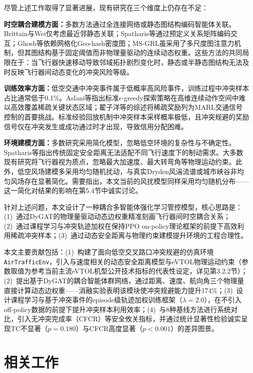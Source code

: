 \documentclass[12pt,a4paper,UTF8]{ctexart}
\begin{document}
尽管上述工作取得了显著进展，现有研究在三个维度上仍存在不足：

\textbf{时空耦合建模方面：}多数方法通过全连接网络或静态图结构编码智能体关联。Brittain与Wei仅考虑最近邻静态关联\cite{ref3}；Spatharis等通过预定义关系矩阵编码交互\cite{ref7}；Ghosh等依赖网格化Geo-hash密度图\cite{ref9}；MS-GRL虽采用了多尺度图注意力机制，但其图结构基于固定阈值而非物理量驱动的连续动态权重\cite{ref24}。这些方法的共同局限在于：当飞行器快速移动导致邻域拓扑剧烈变化时，静态或半静态图结构无法及时反映飞行器间动态变化的冲突风险等级。

\textbf{训练效率方面：}低空交通中冲突事件属于低概率高风险事件，训练过程中冲突样本占比通常低于0.1\%。Aslani等指出标准$\epsilon$-greedy探索策略在高维连续动作空间中难以高效覆盖稀疏关键状态区域\cite{ref10}；翟子洋等的综述将稀疏奖励列为MARL交通信号控制的首要挑战\cite{ref11}。标准经验回放机制中冲突样本采样概率极低，且冲突规避的奖励信号仅在冲突发生或成功通过时才出现，导致信用分配困难。

\textbf{环境建模方面：}多数研究采用简化模型，忽略低空环境的复杂性与不确定性。Spatharis等指出传统固定安全距离无法适配不同飞行速度下的制动需求\cite{ref7}。大多数现有研究将飞行器视为质点，忽略最大加速度、最大转弯角等物理运动约束。此外，低空风场建模多采用均匀随机扰动，与真实Dryden风湍流谱或城市峡谷非均匀风场存在显著简化。需要指出，本文当前的风扰模型同样采用均匀随机分布——这一简化对结果的影响在第5.4节中诚实讨论。

针对上述问题，本文设计了一种耦合多智能体强化学习管控模型，核心思路是：(1)~通过DyGAT的物理量驱动动态边权重精准刻画飞行器间时空耦合关系；(2)~通过课程学习与冲突轨迹加权在保持PPO on-policy理论框架的前提下高效利用稀疏冲突样本；(3)~通过动态安全距离与物理约束建模提升环境的工程合理性。

本文主要贡献包括：(1)~构建了面向低空交叉路口冲突规避的仿真环境\texttt{AirTrafficEnv}，引入与速度相关的动态安全距离模型与eVTOL物理运动约束（参数取值为参考当前主流eVTOL机型公开技术指标的代表性设定，详见第3.2.2节）；(2)~提出基于DyGAT的耦合智能体群网络，通过距离、速度、航向角三个物理量直接计算动态边权重——消融实验表明该模块使冲突规避能力提升174\%；(3)~设计课程学习与基于冲突事件的episode级轨迹加权训练框架（$\lambda=2.0$），在不引入off-policy数据的前提下提升冲突样本利用效率；(4)~与8种基线方法进行系统对比，引入无冲突完成率（CFCR）等安全攸关指标，并通过统计显著性检验诚实呈现TC不显著（$p=0.180$）与CFCR高度显著（$p<0.001$）的差异图景。

\section{相关工作}
\end{document}
